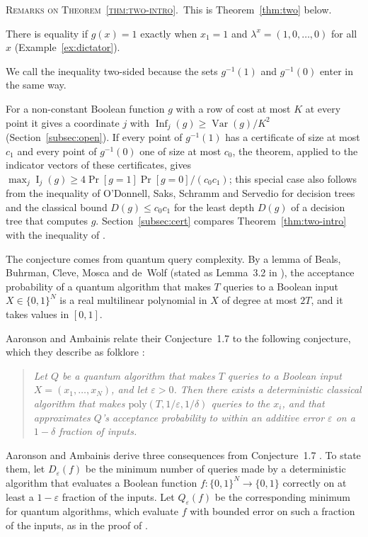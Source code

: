 \documentclass[11pt,reqno]{amsart}
\makeatletter
\theoremstyle{definition}
\theoremstyle{remark}
\numberwithin{equation}{section}
\theoremstyle{named}
\theoremstyle{plain}
\newcommand{\introhead}[1]{\par\medskip\noindent\textsc{#1.}\ }
\renewcommand{\subsection}{\@startsection{subsection}{2}%
  \z@{1.0\linespacing\@plus.4\linespacing\@minus.15\linespacing}{-.5em}{\normalfont\bfseries}}
\newcommand{\Var}{\operatorname{Var}}
\newcommand{\Inf}{\operatorname{Inf}}
\newcommand{\I}{\operatorname{I}}
\newcommand{\eps}{\varepsilon}
\makeatother
\begin{document}
\introhead{Remarks on Theorem~\ref{thm:two-intro}}This is Theorem~\ref{thm:two} below.

There is
equality if $g(x)=1$ exactly when $x_1=1$ and
$\lambda^{x}=(1,0,\dots,0)$ for all $x$ (Example~\ref{ex:dictator}).

We call the inequality two-sided because the sets $g^{-1}(1)$ and $g^{-1}(0)$ enter in the same
way.

For a non-constant Boolean function $g$ with a row of cost at most $K$ at every point it gives
a coordinate $j$ with $\Inf_j(g)\ge\Var(g)/K^{2}$ (Section~\ref{subsec:open}). If every point of
$g^{-1}(1)$ has a certificate of size at most $c_1$ and every point of $g^{-1}(0)$ one of size at
most $c_0$, the theorem, applied to the indicator vectors of these certificates, gives
$\max_j\I_j(g)\ge4\Pr[g=1]\Pr[g=0]/(c_0c_1)$; this special case also follows from the inequality of O'Donnell, Saks, Schramm and Servedio \cite{OSSS} for decision trees and the
classical bound $D(g)\le c_0c_1$ for the least depth $D(g)$ of a decision tree that computes $g$.
Section~\ref{subsec:cert} compares
Theorem~\ref{thm:two-intro} with the inequality of \cite{OSSS}.

\subsection{Motivation and consequences}\label{subsec:motivation}

The conjecture comes from quantum query complexity. By a lemma of Beals, Buhrman, Cleve, Mosca and
de~Wolf \cite{BBCMW} (stated as Lemma~3.2 in \cite{AA14}), the acceptance probability of a quantum
algorithm that makes $T$ queries to a Boolean input $X\in\{0,1\}^{N}$ is a real multilinear polynomial
in $X$ of degree at most $2T$, and it takes values in $[0,1]$.

Aaronson and Ambainis relate their
Conjecture~1.7 to the following conjecture, which they describe as folklore
\cite[Conjecture~1.5]{AA14}:

\begin{quote}
\emph{Let $Q$ be a quantum algorithm that makes $T$ queries to a Boolean input $X=(x_1,\dots,x_N)$, and
let $\eps>0$. Then there exists a deterministic classical algorithm that makes
$\mathrm{poly}(T,1/\eps,1/\delta)$ queries to the $x_i$, and that approximates $Q$'s acceptance
probability to within an additive error $\eps$ on a $1-\delta$ fraction of inputs.}
\end{quote}

Aaronson and Ambainis derive three consequences from Conjecture~1.7 \cite[Theorem~1.8]{AA14}. To
state them, let $D_{\eps}(f)$ be the minimum number of queries made by a deterministic
algorithm that evaluates a Boolean function $f\colon\{0,1\}^{N}\to\{0,1\}$ correctly on at least a
$1-\eps$ fraction of the inputs. Let $Q_{\eps}(f)$ be the corresponding minimum for quantum
algorithms, which evaluate $f$ with bounded error on such a fraction of the inputs, as in the proof of
\cite[Corollary~3.4]{AA14}.
\end{document}
